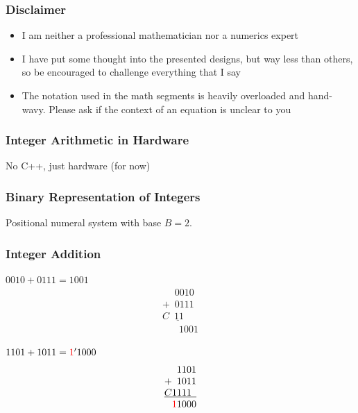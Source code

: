 \documentclass[aspectratio=169]{beamer}
\begin{document}
\begin{frame}
  \frametitle{Disclaimer}
  
  \begin{itemize}
  \item I am neither a professional mathematician nor a numerics expert
  \item I have put some thought into the presented designs, but way less than others, so be encouraged to challenge everything that I say
  \item The notation used in the math segments is heavily overloaded and hand-wavy. Please ask if the context of an equation is unclear to you
  \end{itemize}
\end{frame}

\begin{frame}
  \frametitle{Integer Arithmetic in Hardware}
  
  No C++, just hardware (for now)
\end{frame}

\begin{frame}
  \frametitle{Binary Representation of Integers}
  
  \begin{center}
  \Huge
  \end{center}
  
  Positional numeral system with base $B=2$.
\end{frame}

\begin{frame}
  \frametitle{Integer Addition}
  
  $0010 + 0111 = 1001$
  \begin{equation*}
    \begin{array}{c}
    \phantom{+9}0010\\
    +\phantom{9}0111 \\
    \underline{C\phantom{9}11\phantom{99}} \\
    \phantom{+}\phantom{9}1001
    \end{array}
  \end{equation*}
  
  $1101 + 1011 = \textcolor{red}{1}'1000$
  \begin{equation*}
    \begin{array}{c}
    \phantom{+9}1101\\
    +\phantom{9}1011 \\
    \underline{C1111\phantom{9}} \\
    \phantom{+}\textcolor{red}{1}1000
    \end{array}
  \end{equation*}
\end{frame}
\end{document}
